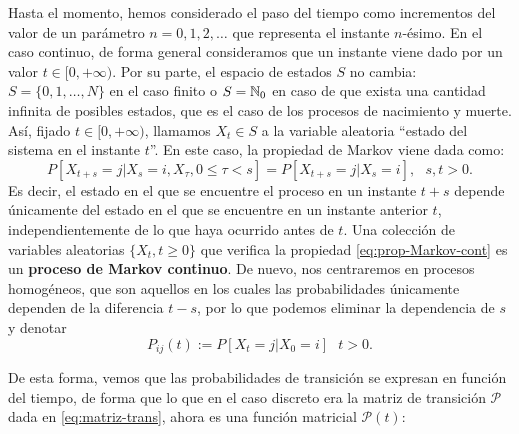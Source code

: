     Hasta el momento, hemos considerado el paso del tiempo como incrementos del valor de un parámetro $n=0,1,2,\dots$ que representa el instante $n$-ésimo. En el caso continuo, de forma general consideramos que un instante viene dado por un valor $t\in[0,+\infty)$. Por su parte, el espacio de estados $S$ no cambia: $S=\{0,1,\dots,N\}$ en el caso finito o $S=\mathbb{N}_0$ en caso de que exista una cantidad infinita de posibles estados, que es el caso de los procesos de nacimiento y muerte. Así, fijado $t\in[0,+\infty)$, llamamos $X_t\in S$ a la variable aleatoria ``estado del sistema en el instante $t$''. En este caso, la propiedad de Markov viene dada como:
    \begin{equation}
        \label{eq:prop-Markov-cont}
        P[X_{t+s}=j|X_s=i, X_\tau, 0\leq \tau < s] = P[X_{t+s}=j|X_s=i], \ \ \ s,t>0.
    \end{equation}
    Es decir, el estado en el que se encuentre el proceso en un instante $t+s$ depende únicamente del estado en el que se encuentre en un instante anterior $t$, independientemente de lo que haya ocurrido antes de $t$.  Una colección de variables aleatorias $\{X_t, t\geq 0\}$ que verifica la propiedad \eqref{eq:prop-Markov-cont} es un \textbf{proceso de Markov continuo}. De nuevo, nos centraremos en procesos homogéneos, que son aquellos en los cuales las probabilidades únicamente dependen de la diferencia $t-s$, por lo que podemos eliminar la dependencia de $s$ y denotar
    \begin{equation}
        \label{eq:prob-trans-cont}
       P_{ij}(t) := P[X_{t}=j|X_0=i]  \ \ \ t>0.
    \end{equation}
    
    De esta forma, vemos que las probabilidades de transición se expresan en función del tiempo, de forma que lo que en el caso discreto era la matriz de transición $\mathcal{P}$ dada en \eqref{eq:matriz-trans}, ahora es una función matricial $\mathcal{P}(t)$:

